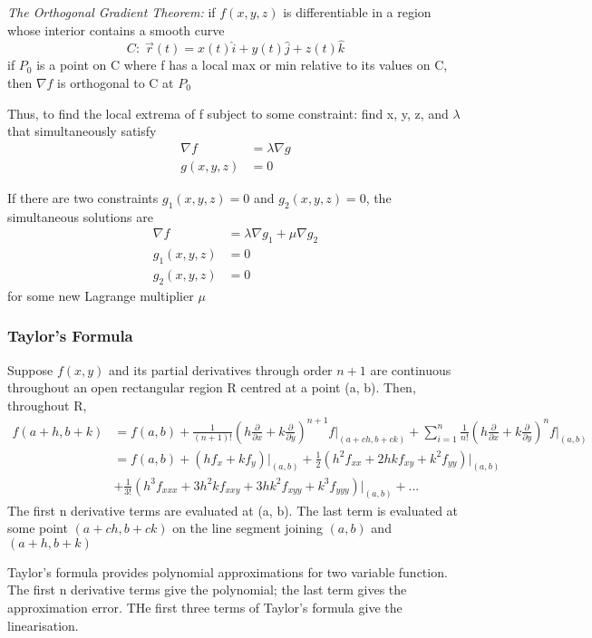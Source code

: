 \documentclass[12pt]{article}
\begin{document}
\emph{The Orthogonal Gradient Theorem:} if $f(x,y,z)$ is differentiable in a region whose interior contains a smooth curve 
\[ C: \; \vec{r}(t) = x(t) \hat{i} + y(t) \hat{j} + z(t) \hat{k} \]
if $P_0$ is a point on C where f has a local max or min relative to its values on C, then $\nabla f$ is orthogonal to C at $P_0$


Thus, to find the local extrema of f subject to some constraint: find x, y, z, and $\lambda$ that simultaneously satisfy
\begin{align*}
    \nabla f &= \lambda \nabla g\\
    g(x, y, z) &= 0
\end{align*}

If there are two constraints $g_1(x,y,z)=0$ and $g_2(x,y,z)=0$, the simultaneous solutions are 
\begin{align*}
    \nabla f &= \lambda \nabla g_1 + \mu \nabla g_2\\
    g_1(x,y,z) &= 0\\
    g_2(x, y, z) &= 0
\end{align*} 
for some new Lagrange multiplier $\mu$

\subsubsection{Taylor's Formula}
Suppose $f(x,y)$ and its partial derivatives through order $n+1$ are continuous throughout an open rectangular region R centred at a point (a, b). Then, throughout R,
\begin{align*}
    f(a + h, b + k) &= f(a, b) + \frac{1}{(n+1)!} \left(h \frac{\partial}{\partial x} + k \frac{\partial}{\partial y}\right)^{n+1} f \bigg|_{(a+ch, b+ck)} + \sum_{i = 1}^n \frac{1}{n!} \left(h \frac{\partial}{\partial x} + k \frac{\partial}{\partial y}\right)^n f \bigg|_{(a, b)}\\
    &= f(a, b) + (hf_x + kf_y)\big|_{(a,b)} +\frac{1}{2}(h^2 f_{xx} + 2hkf_{xy} + k^2f_{yy})\big|_{(a,b)}\\
    &+ \frac{1}{3!}(h^3 f_{xxx} + 3h^2kf_{xxy} + 3hk^2f_{xyy} + k^3 f_{yyy})\big|_{(a,b)} + ... 
\end{align*}
The first n derivative terms are evaluated at (a, b). The last term is evaluated at some point $(a + ch, b + ck)$ on the line segment joining $(a, b)$ and $(a + h, b + k)$

Taylor's formula provides polynomial approximations for two variable function. The first n derivative terms give the polynomial; the last term gives the approximation error. THe first three terms of Taylor's formula give the linearisation. 
\end{document}

